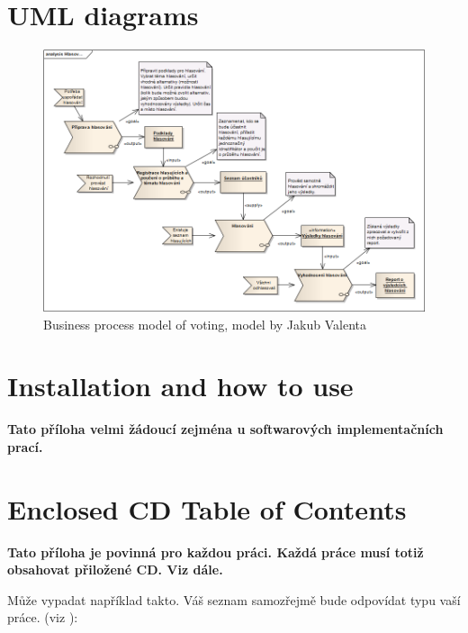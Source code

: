 \documentclass[11pt,twoside,a4paper]{book}
\begin{document}
\chapter{UML diagrams}
\begin{figure}[h]
\begin{center}
\includegraphics[width=14cm]{figures/VotingCZECH}
\caption{Business process model of voting, model by Jakub Valenta}
\label{fig:businessMOD}
\end{center}
\end{figure}

\chapter{Installation and how to use}
\textbf{\large Tato příloha velmi žádoucí zejména u softwarových implementačních prací.}

\chapter{Enclosed CD Table of Contents}
\textbf{\large Tato příloha je povinná pro každou práci. Každá práce musí totiž obsahovat přiložené CD. Viz dále.}

Může vypadat například takto. Váš seznam samozřejmě bude odpovídat typu vaší práce. (viz \cite{infodp}):
\end{document}

